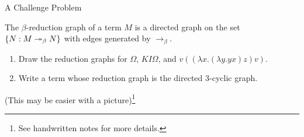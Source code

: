 \documentclass[10pt]{beamer}
\begin{document}
\begin{frame}{A Challenge Problem}
\begin{definition}
The $\beta$-reduction graph of a term $M$ is a directed graph on the set $\{N : M \twoheadrightarrow_\beta N\}$ with edges generated by $\to_\beta$.
\end{definition}
\vfill

\begin{enumerate}
\item Draw the reduction graphs for $\Omega$, $KI\Omega$, and $v((\lambda x . (\lambda y . yx)z) v)$.
\item Write a term whose reduction graph is the directed 3-cyclic graph.
\end{enumerate}
\vfill

(This may be easier with a picture)\footnote{See handwritten notes for more details.}



\end{frame}
\end{document}
